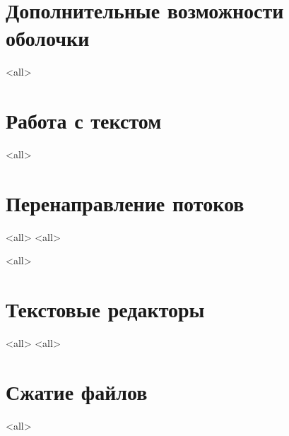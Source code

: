 \section{Дополнительные возможности оболочки}
\mode<all>{}


\section{Работа с текстом}
\mode<all>{}

\section{Перенаправление потоков}
\mode<all>{}
\mode<all>{}


\mode<all>{}

\section{Текстовые редакторы}
\mode<all>{}
\mode<all>{}

\section{Сжатие файлов}
\mode<all>{}



